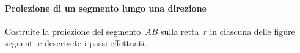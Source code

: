 \paragraph{Proiezione di un segmento lungo una direzione}

\begin{esercizio}
\label{ese:G.11}
Costruite la proiezione del segmento~\(AB\) sulla retta~\(r\) in ciascuna delle 
figure seguenti e descrivete i passi effettuati.
\begin{center}
\begin {inaccessibleblock}
 
\end {inaccessibleblock}
\end{center}
\end{esercizio}







